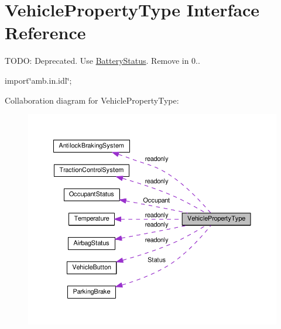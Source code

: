 \hypertarget{interfaceVehiclePropertyType}{\section{Vehicle\+Property\+Type Interface Reference}
\label{interfaceVehiclePropertyType}
}


T\+O\+D\+O\+: Deprecated. Use \hyperlink{interfaceBatteryStatus}{Battery\+Status}. Remove in 0..  




{\ttfamily import\char`\"{}amb.\+in.\+idl\char`\"{};}



Collaboration diagram for Vehicle\+Property\+Type\+:\nopagebreak
\begin{figure}[H]
\begin{center}
\leavevmode
\includegraphics[width=350pt]{interfaceVehiclePropertyType__coll__graph}
\end{center}
\end{figure}
